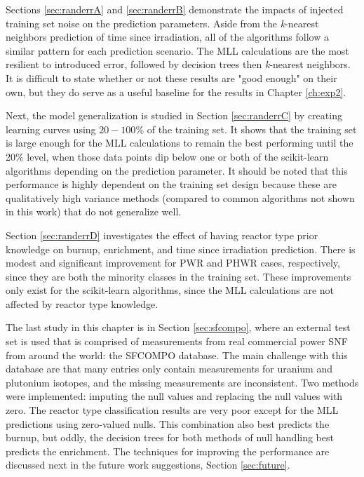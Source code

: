 Sections \ref{sec:randerrA} and \ref{sec:randerrB} demonstrate the impacts of
injected training set noise on the prediction parameters. Aside from the
\textit{k}-nearest neighbors prediction of time since irradiation, all of the
algorithms follow a similar pattern for each prediction scenario.  The
\gls{MLL} calculations are the most resilient to introduced error, followed by
decision trees then \textit{k}-nearest neighbors.  It is difficult to state
whether or not these results are "good enough" on their own, but they do serve
as a useful baseline for the results in Chapter \ref{ch:exp2}. 

Next, the model generalization is studied in Section \ref{sec:randerrC} by
creating learning curves using $20-100\%$ of the training set.  It shows that
the training set is large enough for the \gls{MLL} calculations to remain the
best performing until the 20\% level, when those data points dip below one or
both of the scikit-learn algorithms depending on the prediction parameter. It
should be noted that this performance is highly dependent on the training set
design because these are qualitatively high variance methods (compared to
common algorithms not shown in this work) that do not generalize well. 

Section \ref{sec:randerrD} investigates the effect of having reactor type prior
knowledge on burnup, enrichment, and time since irradiation prediction.  There
is modest and significant improvement for \gls{PWR} and \gls{PHWR} cases,
respectively, since they are both the minority classes in the training set.
These improvements only exist for the scikit-learn algorithms, since the
\gls{MLL} calculations are not affected by reactor type knowledge.

The last study in this chapter is in Section \ref{sec:sfcompo}, where an
external test set is used that is comprised of measurements from real
commercial power \gls{SNF} from around the world: the \gls{SFCOMPO} database.
The main challenge with this database are that many entries only contain
measurements for uranium and plutonium isotopes, and the missing measurements
are inconsistent. Two methods were implemented: imputing the null values and
replacing the null values with zero.  The reactor type classification results
are very poor except for the \gls{MLL} predictions using zero-valued nulls.
This combination also best predicts the burnup, but oddly, the decision trees
for both methods of null handling best predicts the enrichment.  The
techniques for improving the performance are discussed next in the future work
suggestions, Section \ref{sec:future}.

